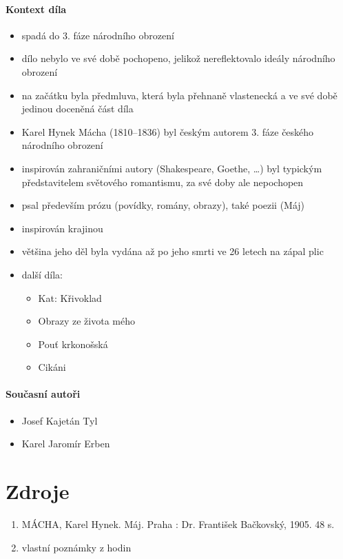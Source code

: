 \documentclass[10pt,a4paper]{article}
\begin{document}
\paragraph{Kontext díla}
\begin{itemize}
\item spadá do 3. fáze národního obrození
\item dílo nebylo ve své době pochopeno, jelikož nereflektovalo ideály národního obrození
\item na začátku byla předmluva, která byla přehnaně vlastenecká a ve své době jedinou doceněná část díla


\item Karel Hynek Mácha (1810--1836) byl českým autorem 3. fáze českého národního obrození
\item  inspirován zahraničními autory (Shakespeare, Goethe, \ldots) byl typickým představitelem světového romantismu, za své doby ale nepochopen
\item psal především prózu (povídky, romány, obrazy), také poezii (Máj) 
\item inspirován krajinou
\item většina jeho děl byla vydána až po jeho smrti ve 26 letech na zápal plic
\item další díla:
	\begin{itemize}
	\item Kat: Křivoklad
	\item Obrazy ze života mého
	\item Pouť krkonošská
	\item Cikáni
	\end{itemize}

\end{itemize}

\paragraph{Současní autoři}
\begin{itemize}
\item Josef Kajetán Tyl
\item Karel Jaromír Erben
\end{itemize}
\section*{Zdroje}
\begin{enumerate}
\item MÁCHA, Karel Hynek. Máj. Praha : Dr. František Bačkovský, 1905. 48 s.
\item vlastní poznámky z hodin 
\end{enumerate}
\end{document}
